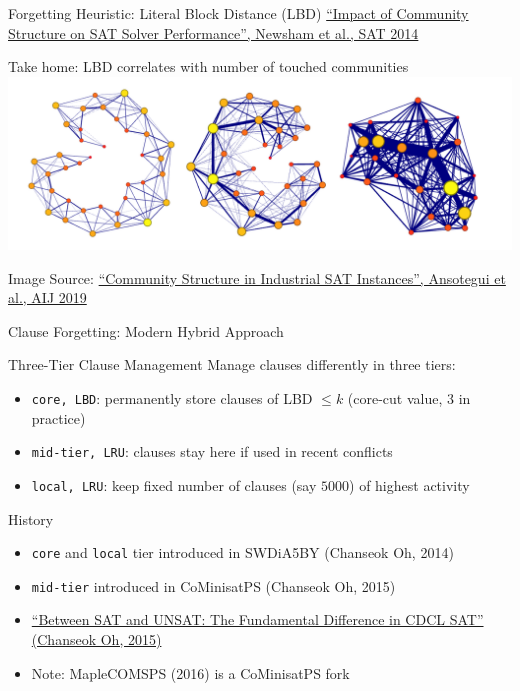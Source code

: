 \documentclass[t]{sdqbeamer}
\begin{document}
    
\begin{frame}{Forgetting Heuristic: Literal Block Distance (LBD)}
\href{http://www.cril.univ-artois.fr/articles/communities.pdf}{``Impact of Community Structure on SAT Solver Performance'', Newsham et al., SAT 2014}
\begin{block}{Take home: LBD correlates with number of touched communities}
\centering
\centering\includegraphics[width=.9\linewidth]{figures/l06/community-structure-and-learning.png}
\vspace*{-1em}
\begin{flushright}
    \footnotesize
    Image Source: \href{https://arxiv.org/pdf/1606.03329}{``Community Structure in Industrial SAT Instances'', Ansotegui et al., AIJ 2019}
\end{flushright}
\end{block}
\end{frame}
    
    
\begin{frame}{Clause Forgetting: Modern Hybrid Approach}
\begin{block}{Three-Tier Clause Management}
    Manage clauses differently in three tiers: 
    \begin{itemize}
    \item \texttt{core, LBD}: permanently store clauses of LBD $\leq k$ (core-cut value, $3$ in practice)
    \item \texttt{mid-tier, LRU}: clauses stay here if used in recent conflicts
    \item \texttt{local, LRU}: keep fixed number of clauses (say $5000$) of highest activity
    \end{itemize}
\end{block}
\begin{block}{History}
    \begin{itemize}
    \item \texttt{core} and \texttt{local} tier introduced in SWDiA5BY (Chanseok Oh, 2014)
    \item \texttt{mid-tier} introduced in CoMinisatPS (Chanseok Oh, 2015)
    \item \href{https://link.springer.com/chapter/10.1007/978-3-319-24318-4_23}{``Between SAT and UNSAT: The Fundamental Difference in CDCL SAT'' (Chanseok Oh, 2015)}
    \item Note: MapleCOMSPS (2016) is a CoMinisatPS fork
    \end{itemize}
\end{block}
\end{frame}
\end{document}
